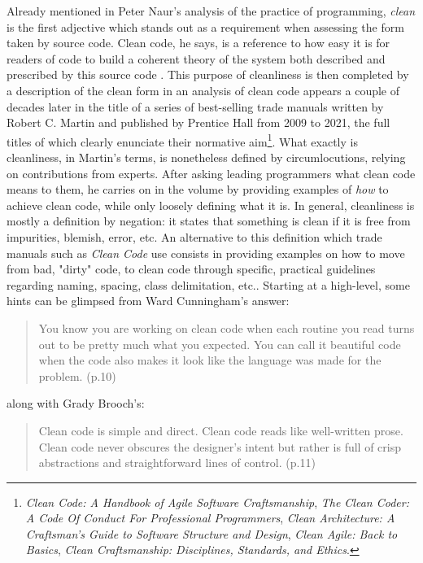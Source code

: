 Already mentioned in Peter Naur's analysis of the practice of programming, \emph{clean} is the first adjective which stands out as a requirement when assessing the form taken by source code. Clean code, he says, is a reference to how easy it is for readers of code to build a coherent theory of the system both described and prescribed by this source code \citep{naur_programming_1985}. This purpose of cleanliness is then completed by a description of the clean form in an analysis of clean code appears a couple of decades later in the title of a series of best-selling trade manuals written by Robert C. Martin and published by Prentice Hall from 2009 to 2021, the full titles of which clearly enunciate their normative aim\footnote{\emph{Clean Code: A Handbook of Agile Software Craftsmanship}, \emph{The Clean Coder: A Code Of Conduct For Professional Programmers}, \emph{Clean Architecture: A Craftsman's Guide to Software Structure and Design}, \emph{Clean Agile: Back to Basics}, \emph{Clean Craftsmanship: Disciplines, Standards, and Ethics}.}. What exactly is cleanliness, in Martin's terms, is nonetheless defined by circumlocutions, relying on contributions from experts. After asking leading programmers what clean code means to them, he carries on in the volume by providing examples of \emph{how} to achieve clean code, while only loosely defining what it is. In general, cleanliness is mostly a definition by negation: it states that something is clean if it is free from impurities, blemish, error, etc. An alternative to this definition which trade manuals such as \emph{Clean Code} use consists in providing examples on how to move from bad, "dirty" code, to clean code through specific, practical guidelines regarding naming, spacing, class delimitation, etc.. Starting at a high-level, some hints can be glimpsed from Ward Cunningham's answer:

\begin{quote}
  You know you are working on clean code when each routine you read turns out to be pretty much what you expected. You can call it beautiful code when the code also makes it look like the language was made for the problem. \citep{martin_clean_2008} (p.10)
\end{quote}

along with Grady Brooch's:

\begin{quote}
  Clean code is simple and direct. Clean code reads like well-written prose. Clean code never obscures the designer’s intent but rather is full of crisp abstractions and straightforward lines of control. \citep{martin_clean_2008} (p.11)
\end{quote}

